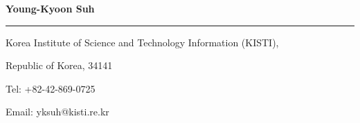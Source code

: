 \documentclass{letter} %
\begin{document}
\signature{Young-Kyoon Suh}           %
\longindentation=0pt                       %
\let\raggedleft\raggedright                %
 
\begin{letter}{
%
}

\begin{flushleft}
{\large\bf Young-Kyoon Suh}
\end{flushleft}
\medskip\hrule height 1pt
\begin{flushright}
\end{flushright}
\vspace{-.15in}
\begin{flushright}
\hfill Korea Institute of Science and Technology Information (KISTI), 
\end{flushright}
\vspace{-.15in}
\begin{flushright}
\hfill Republic of Korea, 34141
\end{flushright}
\vspace{-.15in}
\begin{flushright}
\hfill Tel: +82-42-869-0725
\end{flushright}
\vspace{-.15in}
\begin{flushright}
\hfill Email: yksuh@kisti.re.kr
\end{flushright} 


\end{letter}
\end{document}
